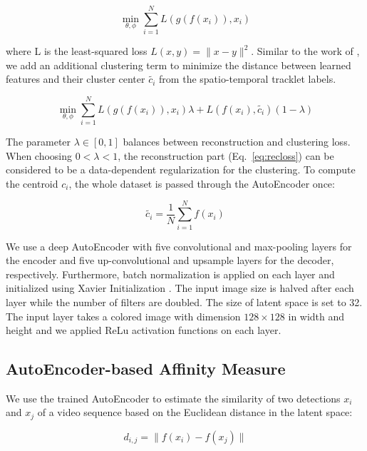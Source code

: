 \begin{equation}
\label{eq:recloss}
\min_{\theta, \phi} \sum_{i=1}^{N} L (g(f(x_i)), x_i)
\end{equation}

where L is the least-squared loss $L(x,y)=\|x-y\|^2$.
Similar to the work of \cite{yang2016towards}, we add an additional clustering term to minimize the distance between learned features and their cluster center $\tilde{c_i}$ from the spatio-temporal tracklet labels.

\begin{equation}
\label{eq:clusterloss}
\min_{\theta, \phi} \sum_{i=1}^{N} L (g(f(x_i)), x_i)\lambda + L (f(x_i),\tilde{c_i})(1-\lambda)
\end{equation}

The parameter $\lambda \in [0, 1]$ balances between reconstruction and clustering loss.
When choosing $0 < \lambda < 1$, the reconstruction part (Eq.~\eqref{eq:recloss}) can be considered to be a data-dependent regularization for the clustering.
To compute the centroid $c_i$, the whole dataset is passed through the AutoEncoder once:

\begin{equation}
\label{eq:centroid}
\tilde{c_i} = \frac{1}{N} \sum_{i=1}^{N} f(x_i)
\end{equation}

We use a deep AutoEncoder with five convolutional and max-pooling layers for the encoder and five up-convolutional and upsample layers for the decoder, respectively. 
Furthermore, batch normalization is applied on each layer and initialized using Xavier Initialization \cite{glorot2010understanding}. 
The input image size is halved after each layer while the number of filters are doubled. 
The size of latent space is set to 32. 
The input layer takes a colored image with dimension $128\times 128$ in width and height and we applied ReLu activation functions on each layer.

\subsection{AutoEncoder-based Affinity Measure}
\label{subsec:affinity}
We use the trained AutoEncoder to estimate the similarity of two detections $x_i$ and $x_j$ of a video sequence based on the Euclidean distance in the latent space:

\begin{equation}
\label{eq:euclid}
d_{i, j} = \|f(x_i) - f(x_j)\|
\end{equation}

